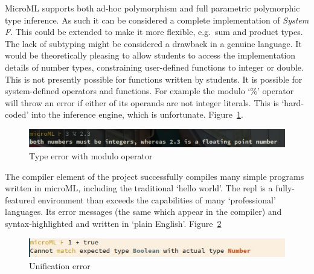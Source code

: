 \documentclass[12pt, a4paper]{report}
\begin{document}
MicroML supports both ad-hoc polymorphism and full parametric polymorphic type inference. As such
it can be considered a complete implementation of \textit{System F}. This could be extended to
make it more flexible, e.g.\ sum and product types. The lack of subtyping might be considered a
drawback in a genuine language. It would be theoretically pleasing to allow students to access the
implementation details of number types, constraining user-defined functions to integer or double.
This is not presently possible for functions written by students. It is possible for
system-defined operators and functions. For example the modulo `\%' operator will throw an error
if either of its operands are not integer literals. This is `hard-coded' into the inference engine,
which is unfortunate. Figure~\ref{fig:modulo}.

\begin{figure}
    \includegraphics[width=\textwidth]{images/modulo.jpg}
    \caption{Type error with modulo operator}
\label{fig:modulo}
\end{figure}

The compiler element of the project successfully compiles many simple programs written in microML,
including the traditional `hello world'. The repl is a fully-featured environment than exceeds the
capabilities of many `professional' languages. Its error messages (the same which appear in the
compiler) and syntax-highlighted and written in `plain English'. Figure~\ref{fig:typeError}

\begin{figure}
    \includegraphics[width=\textwidth]{images/typeError.jpg}
    \caption{Unification error}
\label{fig:typeError}
\end{figure}
\end{document}

